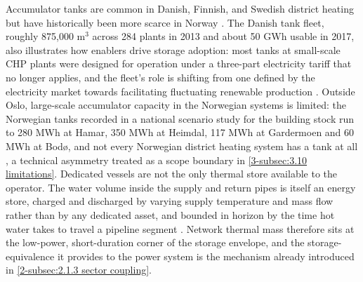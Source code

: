 Accumulator tanks are common in Danish, Finnish, and Swedish district heating but have historically been more scarce in Norway \cite{sandberg_framework_2018}. The Danish tank fleet, roughly 875,000 m$^3$ across 284 plants in 2013 and about 50 GWh usable in 2017, also illustrates how enablers drive storage adoption: most tanks at small-scale CHP plants were designed for operation under a three-part electricity tariff that no longer applies, and the fleet's role is shifting from one defined by the electricity market towards facilitating fluctuating renewable production \cite{danish_energy_agency_energy_2025}. Outside Oslo, large-scale accumulator capacity in the Norwegian systems is limited: the Norwegian tanks recorded in a national scenario study for the building stock run to 280 MWh at Hamar, 350 MWh at Heimdal, 117 MWh at Gardermoen and 60 MWh at Bodø, and not every Norwegian district heating system has a tank at all \cite{SINTEF_energy_2023}, a technical asymmetry treated as a scope boundary in \autoref{3-subsec:3.10 limitations}. Dedicated vessels are not the only thermal store available to the operator. The water volume inside the supply and return pipes is itself an energy store, charged and discharged by varying supply temperature and mass flow rather than by any dedicated asset, and bounded in horizon by the time hot water takes to travel a pipeline segment \cite{mitridati_power_2018}. Network thermal mass therefore sits at the low-power, short-duration corner of the storage envelope, and the storage-equivalence it provides to the power system is the mechanism already introduced in \autoref{2-subsec:2.1.3 sector coupling}.


